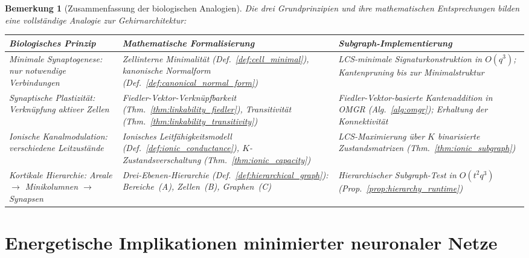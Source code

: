﻿\documentclass[12pt, a4paper, openany]{report}
\newtheorem{remark}[theorem]{Bemerkung}
\begin{document}
\begin{remark}[Zusammenfassung der biologischen Analogien]
\label{rem:bio_summary}
Die drei Grundprinzipien und ihre mathematischen Entsprechungen bilden
eine vollständige Analogie zur Gehirnarchitektur:

\begin{center}
\renewcommand{\arraystretch}{1.4}
\begin{tabular}{p{3.2cm}|p{4.5cm}|p{5.2cm}}
\hline
\textbf{Biologisches Prinzip} & \textbf{Mathematische Formalisierung} & \textbf{Subgraph-Implementierung} \\
\hline
Minimale Synaptogenese: nur notwendige Verbindungen & Zellinterne Minimalität (Def.~\ref{def:cell_minimal}), kanonische Normalform (Def.~\ref{def:canonical_normal_form}) & LCS-minimale Signaturkonstruktion in $O(q^3)$; Kantenpruning bis zur Minimalstruktur \\
\hline
Synaptische Plastizität: Verknüpfung aktiver Zellen & Fiedler-Vektor-Verknüpfbarkeit (Thm.~\ref{thm:linkability_fiedler}), Transitivität (Thm.~\ref{thm:linkability_transitivity}) & Fiedler-Vektor-basierte Kantenaddition in OMGR (Alg.~\ref{alg:omgr}); Erhaltung der Konnektivität \\
\hline
Ionische Kanalmodulation: verschiedene Leitzustände& Ionisches Leitfähigkeitsmodell (Def.~\ref{def:ionic_conductance}), $K$-Zustandsverschaltung (Thm.~\ref{thm:ionic_capacity}) & LCS-Maximierung über $K$ binarisierte Zustandsmatrizen (Thm.~\ref{thm:ionic_subgraph}) \\
\hline
Kortikale Hierarchie: Areale $\to$ Minikolumnen $\to$ Synapsen & Drei-Ebenen-Hierarchie (Def.~\ref{def:hierarchical_graph}): Bereiche~(A), Zellen~(B), Graphen~(C) & Hierarchischer Subgraph-Test in $O(t^2 q^3)$ (Prop.~\ref{prop:hierarchy_runtime}) \\
\hline
\end{tabular}
\end{center}
\end{remark}

\chapter{Energetische Implikationen minimierter neuronaler Netze}
\label{chap:energy}
\end{document}
